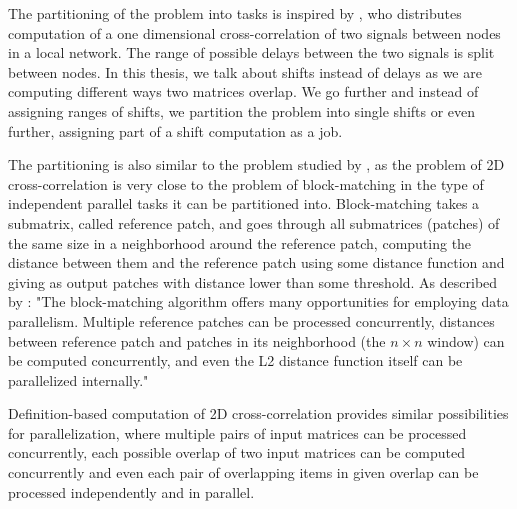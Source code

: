 
The partitioning of the problem into tasks is inspired by \citet{paper:cross_corr_tasks}, who distributes computation of a one dimensional cross-correlation of two signals between nodes in a local network. The range of possible delays between the two signals is split between nodes. In this thesis, we talk about shifts instead of delays as we are computing different ways two matrices overlap. We go further and instead of assigning ranges of shifts, we partition the problem into single shifts or even further, assigning part of a shift computation as a job.


The partitioning is also similar to the problem studied by \citet{paper:krulis_3d_block}, as the problem of 2D cross-correlation is very close to the problem of block-matching in the type of independent parallel tasks it can be partitioned into. Block-matching takes a submatrix, called reference patch, and goes through all submatrices (patches) of the same size in a neighborhood around the reference patch, computing the distance between them and the reference patch using some distance function and giving as output patches with distance lower than some threshold. As described by \citet{paper:krulis_3d_block}: "The block-matching algorithm offers many opportunities
for employing data parallelism. Multiple reference patches
can be processed concurrently, distances between reference
patch and patches in its neighborhood (the $n \times n$ window)
can be computed concurrently, and even the L2 distance
function itself can be parallelized internally."

Definition-based computation of 2D cross-correlation provides similar possibilities for parallelization, where multiple pairs of input matrices can be processed concurrently, each possible overlap of two input matrices can be computed concurrently and even each pair of overlapping items in given overlap can be processed independently and in parallel. 

